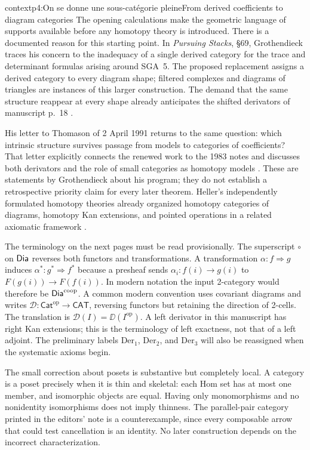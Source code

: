 \begin{dcomment}{context}{p4:On se donne une sous-catégorie pleine}{From derived coefficients to diagram categories}
The opening calculations make the geometric language of supports available before any homotopy theory is introduced. There is a documented reason for this starting point. In \emph{Pursuing Stacks}, \S69, Grothendieck traces his concern to the inadequacy of a single derived category for the trace and determinant formulas arising around SGA~5. The proposed replacement assigns a derived category to every diagram shape; filtered complexes and diagrams of triangles are instances of this larger construction. The demand that the same structure reappear at every shape already anticipates the shifted derivators of manuscript p.~18 \citep[\S69, pp.~1--3 of the edited extract]{Grothendieck1983}.

His letter to Thomason of 2 April 1991 returns to the same question: which intrinsic structure survives passage from models to categories of coefficients? That letter explicitly connects the renewed work to the 1983 notes and discusses both derivators and the role of small categories as homotopy models \citep[pp.~2--4 of the edited letter]{Grothendieck1991Letter}. These are statements by Grothendieck about his program; they do not establish a retrospective priority claim for every later theorem. Heller's independently formulated homotopy theories already organized homotopy categories of diagrams, homotopy Kan extensions, and pointed operations in a related axiomatic framework \citep[Chs.~II--III]{Heller1988}.

The terminology on the next pages must be read provisionally. The superscript $\circ$ on $\mathsf{Dia}$ reverses both functors and transformations. A transformation $\alpha:f\Rightarrow g$ induces $\alpha^*:g^*\Rightarrow f^*$ because a presheaf sends $\alpha_i:f(i)\to g(i)$ to $F(g(i))\to F(f(i))$. In modern notation the input 2-category would therefore be $\mathsf{Dia}^{\mathrm{coop}}$. A common modern convention uses covariant diagrams and writes $\mathscr D:\mathsf{Cat}^{\mathrm{op}}\to\mathsf{CAT}$, reversing functors but retaining the direction of 2-cells. The translation is $\mathscr D(I)=\DD(I^{\mathrm{op}})$. A left derivator in this manuscript has right Kan extensions; this is the terminology of left exactness, not that of a left adjoint. The preliminary labels $\mathrm{Der}_1$, $\mathrm{Der}_2$, and $\mathrm{Der}_3$ will also be reassigned when the systematic axioms begin.

The small correction about posets is substantive but completely local. A category is a poset precisely when it is thin and skeletal: each Hom set has at most one member, and isomorphic objects are equal. Having only monomorphisms and no nonidentity isomorphisms does not imply thinness. The parallel-pair category printed in the editors' note is a counterexample, since every composable arrow that could test cancellation is an identity. No later construction depends on the incorrect characterization.
\end{dcomment}


